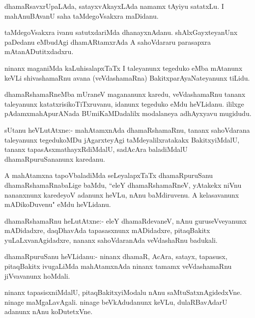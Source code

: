 \documentclass{article}
\begin{document}
\begin{mn}
dhamaRsavxrUpaLAda, satayxvAkayxLAda namamx tAyiyu satatxLu. 
I mahAnuBAvanU saha taMdegoVsakxra maDidanu.
\end{mn} 

\begin{mn}
taMdegoVsakxra ivanu satutxdariMda dhanayxnAdanu. shAlxGayxteyanUnx
paDedanu eMbudAgi dhamARtamxrAda A sahoVdararu parasapxra
mAtanADutitxdadxru.
\end{mn} 

\begin{mn}
ninanx maganiMda kaLuhisalapxTaTx I taleyanunx tegeduko eMba mAtanunx
keVLi shivashamaRnu avana (veVdashamaRna) BakitxparAyaNateyanunx tiLidu.
\end{mn} 

\begin{mn}
dhamaRshamaRneMba mUraneV magananunx karedu, veVdashamaRnu tananx
taleyanunx katatxrisikoTiTxruvanu, idanunx tegeduko eMdu heVLidanu. 
ililxge pAdamxmahApurANada BUmiKaMDadalilx modalaneya adhAyxyavu mugidudu.
\end{mn}


\begin{mn}
sUtanu heVLutAtxne:- mahAtamxnAda dhamaRshamaRnu, tananx sahoVdarana 
taleyanunx tegedukoMDu jAgarxteyAgi taMdeyalilxratakakx 
BakitxyiMdalU, tananx tapasAsxmathayxRdiMdalU, sadAcAra baladiMdalU 
dhamaRpuruSananunx karedanu.
\end{mn} 

\begin{mn}
A mahAtamxna tapoVbaladiMda seLeyalapxTaTx dhamaRpuruSanu 
dhamaRshamaRnabaLige baMdu, ``eleY dhamaRshamaRneV, yAtakekx 
niVnu nananxnunx karedeyoV adanunx heVLu, nAnu baMdiruvenu.
A kelasavanunx mADikoDuvenu" eMdu heVLidanu.           
\end{mn} 

\begin{mn}
dhamaRshamaRnu heLutAtxne:- eleY dhamaRdevaneV, nAnu guruseVveyanunx
 mADidadxre, daqDhavAda tapasasxnunx mADidadxre, pitaqBakitx
yuLaLxvanAgidadxre, nananx sahoVdaranAda veVdashaRnu badukali.
\end{mn}

\begin{mn}
dhamaRpuruSanu heVLidanu:- ninanx dhamaR, AcAra, satayx, tapasusx,
pitaqBakitx ivugaLiMda mahAtamxnAda ninanx tamamx veVdashamaRnu 
jiVvavanunx hoMdali.
\end{mn}

\begin{mn}
ninanx tapasisxniMdalU, pitaqBakitxyiModalu nAnu saMtuSatxnAgidedxVne.
ninage maMgaLavAgali. ninage beVkAdudanunx keVLu, dulaRBavAdarU 
adanunx nAnu koDutetxVne.

\end{mn}
\end{document}
